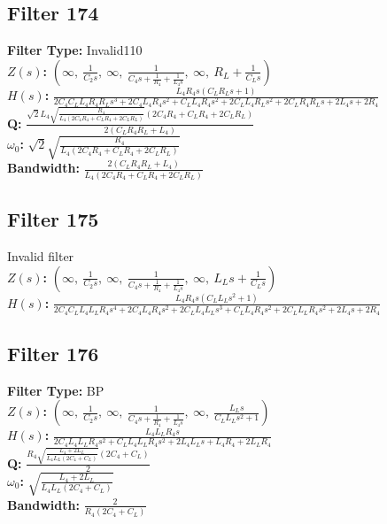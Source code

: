 \documentclass{article}
\begin{document}
\subsection*{Filter 174}
\textbf{Filter Type:} Invalid110 \\ 
\textbf{$Z(s)$:} $\left( \infty, \  \frac{1}{C_{2} s}, \  \infty, \  \frac{1}{C_{4} s + \frac{1}{R_{4}} + \frac{1}{L_{4} s}}, \  \infty, \  R_{L} + \frac{1}{C_{L} s}\right)$ \\ 
\textbf{$H(s)$:} $\frac{L_{4} R_{4} s \left(C_{L} R_{L} s + 1\right)}{2 C_{4} C_{L} L_{4} R_{4} R_{L} s^{3} + 2 C_{4} L_{4} R_{4} s^{2} + C_{L} L_{4} R_{4} s^{2} + 2 C_{L} L_{4} R_{L} s^{2} + 2 C_{L} R_{4} R_{L} s + 2 L_{4} s + 2 R_{4}}$ \\ 
\textbf{Q:} $\frac{\sqrt{2} L_{4} \sqrt{\frac{R_{4}}{L_{4} \left(2 C_{4} R_{4} + C_{L} R_{4} + 2 C_{L} R_{L}\right)}} \left(2 C_{4} R_{4} + C_{L} R_{4} + 2 C_{L} R_{L}\right)}{2 \left(C_{L} R_{4} R_{L} + L_{4}\right)}$ \\ 
\textbf{$\omega_0$:} $\sqrt{2} \sqrt{\frac{R_{4}}{L_{4} \left(2 C_{4} R_{4} + C_{L} R_{4} + 2 C_{L} R_{L}\right)}}$ \\ 
\textbf{Bandwidth:} $\frac{2 \left(C_{L} R_{4} R_{L} + L_{4}\right)}{L_{4} \left(2 C_{4} R_{4} + C_{L} R_{4} + 2 C_{L} R_{L}\right)}$ \\ 
\subsection*{Filter 175}
Invalid filter \\ 
\textbf{$Z(s)$:} $\left( \infty, \  \frac{1}{C_{2} s}, \  \infty, \  \frac{1}{C_{4} s + \frac{1}{R_{4}} + \frac{1}{L_{4} s}}, \  \infty, \  L_{L} s + \frac{1}{C_{L} s}\right)$ \\ 
\textbf{$H(s)$:} $\frac{L_{4} R_{4} s \left(C_{L} L_{L} s^{2} + 1\right)}{2 C_{4} C_{L} L_{4} L_{L} R_{4} s^{4} + 2 C_{4} L_{4} R_{4} s^{2} + 2 C_{L} L_{4} L_{L} s^{3} + C_{L} L_{4} R_{4} s^{2} + 2 C_{L} L_{L} R_{4} s^{2} + 2 L_{4} s + 2 R_{4}}$ \\ 
\subsection*{Filter 176}
\textbf{Filter Type:} BP \\ 
\textbf{$Z(s)$:} $\left( \infty, \  \frac{1}{C_{2} s}, \  \infty, \  \frac{1}{C_{4} s + \frac{1}{R_{4}} + \frac{1}{L_{4} s}}, \  \infty, \  \frac{L_{L} s}{C_{L} L_{L} s^{2} + 1}\right)$ \\ 
\textbf{$H(s)$:} $\frac{L_{4} L_{L} R_{4} s}{2 C_{4} L_{4} L_{L} R_{4} s^{2} + C_{L} L_{4} L_{L} R_{4} s^{2} + 2 L_{4} L_{L} s + L_{4} R_{4} + 2 L_{L} R_{4}}$ \\ 
\textbf{Q:} $\frac{R_{4} \sqrt{\frac{L_{4} + 2 L_{L}}{L_{4} L_{L} \left(2 C_{4} + C_{L}\right)}} \left(2 C_{4} + C_{L}\right)}{2}$ \\ 
\textbf{$\omega_0$:} $\sqrt{\frac{L_{4} + 2 L_{L}}{L_{4} L_{L} \left(2 C_{4} + C_{L}\right)}}$ \\ 
\textbf{Bandwidth:} $\frac{2}{R_{4} \left(2 C_{4} + C_{L}\right)}$ \\ 
\end{document}
